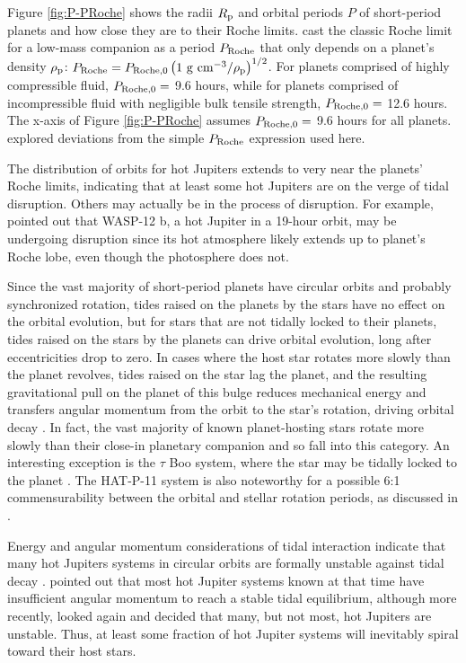 \documentclass{svjour3}                     %
\begin{document}
Figure \ref{fig:P-PRoche} shows the radii $R_{\rm p}$ and orbital periods $P$ of short-period planets and how close they are to their Roche limits. \cite{Rappaport2013Roche} cast the classic Roche limit for a low-mass companion as a period $P_{\rm Roche}$ that only depends on a planet's density $\rho_{\rm p}$: $P_{\rm Roche} = P_{\rm Roche, 0} \left( 1\ {\rm g\ cm^{-3}} / \rho_{\rm p} \right)^{1/2}$. For planets comprised of highly compressible fluid, $P_{\rm Roche, 0} =$ 9.6 hours, while for planets comprised of incompressible fluid with negligible bulk tensile strength, $P_{\rm Roche, 0} =$ 12.6 hours. The x-axis of Figure \ref{fig:P-PRoche} assumes $P_{\rm Roche, 0} =$ 9.6 hours for all planets. \cite{Rappaport2013Roche} explored deviations from the simple $P_{\rm Roche}$ expression used here. 

The distribution of orbits for hot Jupiters extends to very near the planets' Roche limits, indicating that at least some hot Jupiters are on the verge of tidal disruption. Others may actually be in the process of disruption. For example, \cite{2010Natur.463.1054L} pointed out that WASP-12 b, a hot Jupiter in a 19-hour orbit, may be undergoing disruption since its hot atmosphere likely extends up to planet's Roche lobe, even though the photosphere does not. 

Since the vast majority of short-period planets have circular orbits and probably synchronized rotation, tides raised on the planets by the stars have no effect on the orbital evolution, but for stars that are not tidally locked to their planets, tides raised on the stars by the planets can drive orbital evolution, long after eccentricities drop to zero. In cases where the host star rotates more slowly than the planet revolves, tides raised on the star lag the planet, and the resulting gravitational pull on the planet of this bulge reduces mechanical energy and transfers angular momentum from the orbit to the star's rotation, driving orbital decay \cite{2008CeMDA.101..171F}. In fact, the vast majority of known planet-hosting stars rotate more slowly than their close-in planetary companion and so fall into this category. An interesting exception is the $\tau$ Boo system, where the star may be tidally locked to the planet \cite{2008A&A...482..691W}. The HAT-P-11 system is also noteworthy for a possible 6:1 commensurability between the orbital and stellar rotation periods, as discussed in \cite{2014ApJ...788....1B}.

Energy and angular momentum considerations of tidal interaction indicate that many hot Jupiters systems in circular orbits are formally unstable against tidal decay \cite{1973ApJ...180..307C}. \cite{2009ApJ...692L...9L} pointed out that most hot Jupiter systems known at that time have insufficient angular momentum to reach a stable tidal equilibrium, although more recently, \cite{2015MNRAS.446.3676A} looked again and decided that many, but not most, hot Jupiters are unstable. Thus, at least some fraction of hot Jupiter systems will inevitably spiral toward their host stars. 
\end{document}
